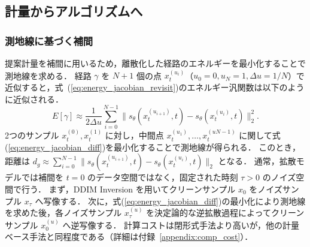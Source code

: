 \documentclass[MIRU,submit]{miru2026j}
\theoremstyle{definition}
\begin{document}

\subsection{計量からアルゴリズムへ}

\subsubsection{測地線に基づく補間}
提案計量を補間に用いるため，離散化した経路のエネルギーを最小化することで測地線を求める．
経路 $\gamma$ を $N+1$ 個の点 $x_t^{(u_i)}$（$u_0=0, u_N=1, \Delta u=1/N$）で近似すると，式~(\ref{eq:energy_jacobian_revisit})のエネルギー汎関数は以下のように近似される．
\begin{equation}
    \textstyle
    \label{eq:energy_jacobian_diff}
    E[\gamma] \approx \frac{1}{2\Delta u} \sum_{i=0}^{N-1} \|s_\theta(x_t^{(u_{i+1})},t) - s_\theta(x_t^{(u_i)},t)\|_2^2.
\end{equation}
2つのサンプル $x_t^{(0)}, x_t^{(1)}$ に対し，中間点 $x_t^{(u_1)}, \dots, x_t^{(u{N-1})}$ に関して式(\ref{eq:energy_jacobian_diff})を最小化することで測地線が得られる．
このとき，距離は $d_g \approx \sum_{i=0}^{N-1} \|s_\theta(x_t^{(u_{i+1})}, t) - s_\theta(x_t^{(u_i)}, t)\|_2$ となる．
通常，拡散モデルでは補間を $t=0$ のデータ空間ではなく，固定された時刻 $\tau > 0$ のノイズ空間で行う．
まず，DDIM Inversion を用いてクリーンサンプル $x_0$ をノイズサンプル $x_\tau$ へ写像する．
次に，式(\ref{eq:energy_jacobian_diff})の最小化により測地線を求めた後，各ノイズサンプル $x_\tau^{(u)}$ を決定論的な逆拡散過程によってクリーンサンプル $x_0^{(u)}$ へ逆写像する．
計算コストは閉形式手法より高いが，他の計量ベース手法と同程度である（詳細は付録~\ref{appendix:comp_cost}）．
\end{document}
